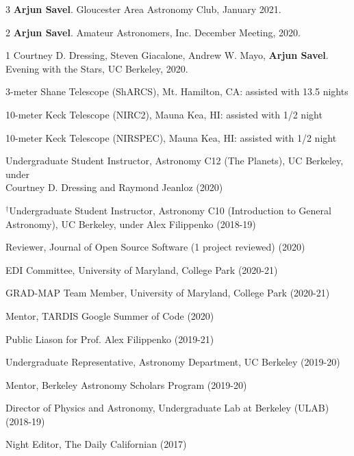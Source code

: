 \documentclass[12pt,letterpaper]{article}
\begin{document}
\begin{list}{}{\cvlist}
\item[{\color{numcolor}\scriptsize3}] \textbf{Arjun Savel}. Gloucester Area Astronomy Club, January 2021.
\item[{\color{numcolor}\scriptsize2}] \textbf{Arjun Savel}. Amateur Astronomers, Inc. December Meeting, 2020.
\item[{\color{numcolor}\scriptsize1}] Courtney D. Dressing, Steven Giacalone, Andrew W. Mayo, \textbf{Arjun Savel}. Evening with the Stars, UC Berkeley, 2020.
\end{list}



\begin{list}{}{\cvlist}

\item 3-meter Shane Telescope (ShARCS), Mt. Hamilton, CA: assisted with 13.5 nights
\item 10-meter Keck Telescope (NIRC2), Mauna Kea, HI: assisted with 1/2 night
\item 10-meter Keck Telescope (NIRSPEC), Mauna Kea, HI: assisted with 1/2 night

\end{list}


\begin{list}{}{\cvlist}
\item Undergraduate Student Instructor, Astronomy C12 (The Planets), UC Berkeley, under \\ Courtney D. Dressing and Raymond Jeanloz (2020)
\item $^\dagger$Undergraduate Student Instructor, Astronomy C10 (Introduction to General \\ Astronomy), UC Berkeley, under Alex Filippenko (2018-19)
\end{list}

\begin{list}{}{\cvlist}
\item Reviewer, Journal of Open Source Software (1 project reviewed) (2020)
\item EDI Committee, University of Maryland, College Park (2020-21)
\item GRAD-MAP Team Member, University of Maryland, College Park (2020-21)
\item Mentor, TARDIS Google Summer of Code (2020)
\item Public Liason for Prof. Alex Filippenko (2019-21)
\item Undergraduate Representative, Astronomy Department, UC Berkeley (2019-20)
\item Mentor, Berkeley Astronomy Scholars Program (2019-20)
\item Director of Physics and Astronomy, Undergraduate Lab at Berkeley (ULAB) (2018-19)
\item Night Editor, The Daily Californian (2017)
\end{list}
\end{document}
